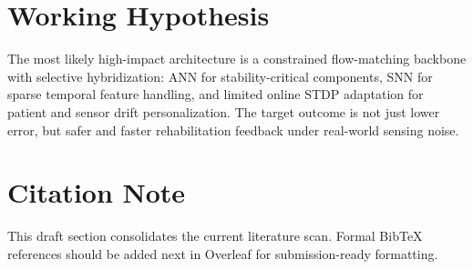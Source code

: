\documentclass[11pt]{article}
\begin{document}
\section{Working Hypothesis}
The most likely high-impact architecture is a constrained flow-matching backbone with selective hybridization: ANN for stability-critical components, SNN for sparse temporal feature handling, and limited online STDP adaptation for patient and sensor drift personalization. The target outcome is not just lower error, but safer and faster rehabilitation feedback under real-world sensing noise.

\section*{Citation Note}
This draft section consolidates the current literature scan. Formal BibTeX references should be added next in Overleaf for submission-ready formatting.
\end{document}
